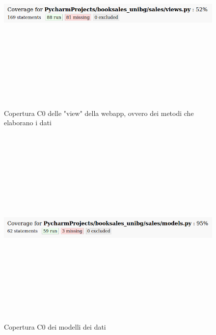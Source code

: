 \documentclass[10pt,a4paper]{report}
\begin{document}
	\begin{figure}[H]
		\centering
		\includegraphics[height=10cm, width=15cm, keepaspectratio]{images/sales_views_test.png}
		\caption{Copertura C0 delle "view" della webapp, ovvero dei metodi che elaborano i dati}
	\end{figure}

	\begin{figure}[H]
		\centering
		\includegraphics[height=10cm, width=15cm, keepaspectratio]{images/sales_models_test.png}
		\caption{Copertura C0 dei modelli dei dati}
	\end{figure}
	
\end{document}
